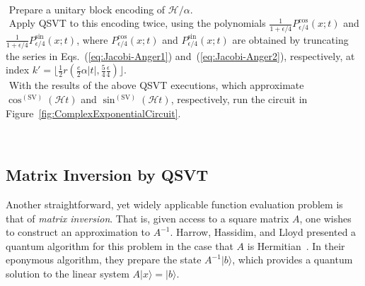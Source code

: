\documentclass[aps,pra,showpacs,notitlepage,twocolumn,superscriptaddress,nofootinbib]{revtex4-1}
\begin{document}
    
    
    $ $ \\
    \begin{algorithm}[htpb] 
     \Proc{}
     $ $ Prepare a unitary block encoding of $\mathcal{H}/\alpha$.\\
     $ $ Apply QSVT to this encoding twice, using the polynomials $\frac{1}{1+\epsilon/4}P_{\epsilon/4}^{\text{cos}}(x;t)$ and $\frac{1}{1+\epsilon/4}P_{\epsilon/4}^{\text{sin}}(x;t)$, where $P_{\epsilon/4}^{\text{cos}}(x;t)$ and $P_{\epsilon/4}^{\text{sin}}(x;t)$ are obtained by truncating the series in Eqs.~(\ref{eq:Jacobi-Anger1}) and~(\ref{eq:Jacobi-Anger2}), respectively, at index $k'=\big\lfloor \frac{1}{2} r(\frac{e}{2} \alpha |t|, \frac{5}{4} \frac{\epsilon}{4}) \big\rfloor$.\\
     $ $ With the results of the above QSVT executions, which approximate $\cos^{(\text{SV})}(\mathcal{H}t)$ and $\sin^{(\text{SV})}(\mathcal{H}t)$, respectively, run the circuit in Figure~\ref{fig:ComplexExponentialCircuit}. \\  
     \caption{Hamiltonian Simulation by QSVT}
     \label{alg:HamiltonianSimulationByQSVT}
    \end{algorithm}
    $ $ \\


\subsection{Matrix Inversion by QSVT}
\label{sec:matrix_inversion}
    
    Another straightforward, yet widely applicable function evaluation problem is that of \emph{matrix inversion}. That is, given access to a square matrix $A$, one wishes to construct an approximation to $A^{-1}$. Harrow, Hassidim, and Lloyd presented a quantum algorithm for this problem in the case that $A$ is Hermitian~\cite{Harrow_2009}. In their eponymous algorithm, they prepare the state $A^{-1}| b \rangle$, which provides a quantum solution to the linear system $A|x\rangle = | b \rangle$.
    
\end{document}
